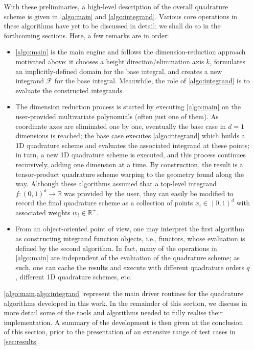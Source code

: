 \documentclass[onefignum,onetabnum,onealgnum,oneeqnum]{siamart190516}
\newcommand{\R}{\mathbb R}
\begin{document}
With these preliminaries, a high-level description of the overall quadrature scheme is given in \cref{algo:main} and \cref{algo:integrand}. Various core operations in these algorithms have yet to be discussed in detail; we shall do so in the forthcoming sections. Here, a few remarks are in order:
\begin{itemize}
\item \cref{algo:main} is the main engine and follows the dimension-reduction approach motivated above: it chooses a height direction/elimination axis $k$, formulates an implicitly-defined domain for the base integral, and creates a new integrand ${\mathcal F}$ for the base integral. Meanwhile, the role of \cref{algo:integrand} is to evaluate the constructed integrands. %
\item The dimension reduction process is started by executing \cref{algo:main} on the user-provided multivariate polynomials (often just one of them). As coordinate axes are eliminated one by one, eventually the base case in $d = 1$ dimensions is reached; the base case executes \cref{algo:integrand} which builds a 1D quadrature scheme and evaluates the associated integrand at these points; in turn, a new 1D quadrature scheme is executed, and this process continues recursively, adding one dimension at a time. By construction, the result is a tensor-product quadrature scheme warping to the geometry found along the way. Although these algorithms assumed that a top-level integrand $f : (0,1)^d \to \R$ was provided by the user, they can easily be modified to record the final quadrature scheme as a collection of points $x_i \in (0,1)^d$ with associated weights $w_i \in \R^+$. %
\item From an object-oriented point of view, one may interpret the first algorithm as constructing integrand function objects, i.e., functors, whose evaluation is defined by the second algorithm. In fact, many of the operations in \cref{algo:main} are independent of the evaluation of the quadrature scheme; as such, one can cache the results and execute with different quadrature orders $q$, different 1D quadrature schemes, etc.
\end{itemize}





%


%


\cref{algo:main,algo:integrand} represent the main driver routines for the quadrature algorithms developed in this work. In the remainder of this section, we discuss in more detail some of the tools and algorithms needed to fully realise their implementation. A summary of the development is then given at the conclusion of this section, prior to the presentation of an extensive range of test cases in \cref{sec:results}. 
\end{document}
